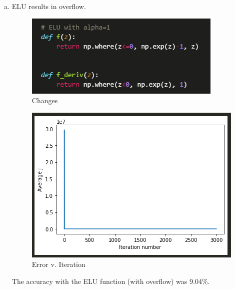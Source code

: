 \documentclass[12pt]{article}
\begin{document}
\begin{enumerate}[(a)]
	\item ELU results in overflow. 
		\begin{figure}[H]
			\centering
			\includegraphics[width=\textwidth/2]{images/7dchange.png}
			\caption{Changes}
			\label{fig:7:d:changes}
		\end{figure}
		\begin{figure}[H]
			\centering
			\includegraphics[width=\textwidth/2]{images/7dgraph.png}
			\caption{Error v. Iteration}
			\label{fig:7:d:graph}
		\end{figure}
		The accuracy with the ELU function (with overflow) was 9.04\%.
	

\end{enumerate}
\end{document}

